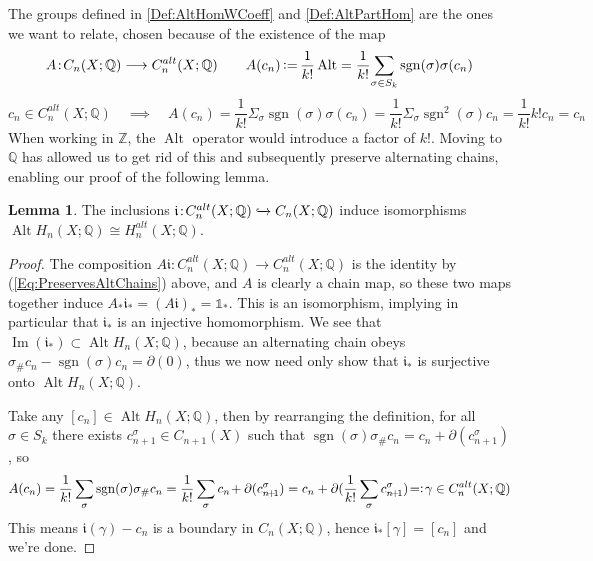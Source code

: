 \documentclass[11pt,a4paper,twoside]{article}
\theoremstyle{plain}
\theoremstyle{definition}
\theoremstyle{definition}
\newtheorem{lemma}[thm]{Lemma}
\theoremstyle{definition}
\theoremstyle{definition}
\theoremstyle{definition}
\DeclareMathOperator{\Ima}{Im}
\DeclareMathOperator{\Alt}{Alt}
\DeclareMathOperator{\sgn}{sgn}
\DeclareMathOperator{\coloneqq}{\vcentcolon=}
\begin{document}
The groups defined in \ref{Def:AltHomWCoeff} and \ref{Def:AltPartHom} are the ones we want to relate, chosen because of the existence of the map 
$$A\!:\!C_n(X;\mathbb{Q})\longrightarrow C_n^{alt}(X;\mathbb{Q})\quad\quad A(c_n)\coloneqq\frac1{k!}\Alt=\frac1{k!}\underset{\sigma \in S_k}\sum\sgn(\sigma)\sigma(c_n)$$
\begin{equation}\label{Eq:PreservesAltChains}
c_n\in C^{alt}_n(X;\mathbb{Q})\quad\implies\quad A(c_n)=\frac1{k!}\Sigma_\sigma\sgn(\sigma)\sigma(c_n)\!=\!\frac1{k!}\Sigma_\sigma\sgn^2(\sigma)c_n\!=\!\frac1{k!}k!c_n\!=\!c_n\end{equation}
When working in $\mathbb{Z}$, the $\Alt$ operator would introduce a factor of $k!$. Moving to $\mathbb{Q}$ has allowed us to get rid of this and subsequently preserve alternating chains, enabling our proof of the following lemma.
\\
\begin{lemma}
\label{Lem:EquivAltPartHomQAltHomQ}
The inclusions $\mathfrak{i}\!:\!C_n^{alt}(X;\mathbb{Q})\xhookrightarrow\!C_n(X;\mathbb{Q})$ induce isomorphisms $\Alt H_n(X;\mathbb{Q})\cong H_n^{alt}(X;\mathbb{Q})$.
\end{lemma}
\begin{proof}
The composition $A\mathfrak{i}\!:\!C^{alt}_n(X;\mathbb{Q})\rightarrow C^{alt}_n(X;\mathbb{Q})$ is the identity by (\ref{Eq:PreservesAltChains}) above, and $A$ is clearly a chain map, so these two maps together induce $A_*\mathfrak{i}_*=(A\mathfrak{i})_*=\mathbb{1}_*$. This is an isomorphism, implying in particular that $\mathfrak{i}_*$ is an injective homomorphism. We see that $\Ima(\mathfrak{i}_*)\subset\Alt H_n(X;\mathbb{Q})$, because an alternating chain obeys $\sigma_\#c_n\!-\!\sgn(\sigma)c_n\!=\!\partial(0)$, thus we now need only show that $\mathfrak{i}_*$ is surjective onto $\Alt H_n(X;\mathbb{Q})$.

Take any $[c_n]\in\Alt H_n(X;\mathbb{Q})$, then by rearranging the definition, for all $\sigma\in S_k$ there exists $c_{n\!+\!1}^\sigma\in C_{n\!+\!1}(X)$ such that $\sgn(\sigma)\sigma_\#c_n\!=\!c_n\!+\!\partial(c_{n\!+\!1}^\sigma)$, so
$$ A(c_n)=\frac1{k!}\sum_\sigma\sgn(\sigma)\sigma_\#c_n=\frac1{k!}\sum_\sigma c_n\!+\partial(c_{n\!+\!1}^\sigma)=c_n+\partial(\frac1{k!}\sum_\sigma c_{n\!+\!1}^\sigma)\!=\vcentcolon\!\gamma\in C_n^{alt}(X;\mathbb{Q})$$
This means $\mathfrak{i}(\gamma)-c_n$ is a boundary in $C_n(X;\mathbb{Q})$, hence $\mathfrak{i}_*[\gamma]=[c_n]$ and we're done.
\end{proof}
\end{document}
